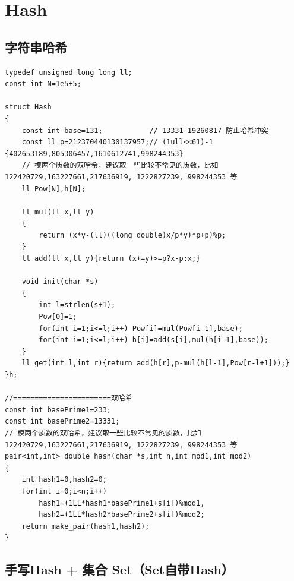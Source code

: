 \section{Hash}
\subsection{字符串哈希}
\begin{verbatim}
typedef unsigned long long ll;
const int N=1e5+5;

struct Hash
{
    const int base=131;           // 13331 19260817 防止哈希冲突
    const ll p=212370440130137957;// (1ull<<61)-1 {402653189,805306457,1610612741,998244353}
    // 模两个质数的双哈希，建议取一些比较不常见的质数，比如 122420729,163227661,217636919, 1222827239, 998244353 等
    ll Pow[N],h[N];
 
    ll mul(ll x,ll y)
    {
        return (x*y-(ll)((long double)x/p*y)*p+p)%p;
    }
    ll add(ll x,ll y){return (x+=y)>=p?x-p:x;} 
 
    void init(char *s)
    {
        int l=strlen(s+1); 
        Pow[0]=1; 
        for(int i=1;i<=l;i++) Pow[i]=mul(Pow[i-1],base);
        for(int i=1;i<=l;i++) h[i]=add(s[i],mul(h[i-1],base));
    }
    ll get(int l,int r){return add(h[r],p-mul(h[l-1],Pow[r-l+1]));}
}h;

//=======================双哈希
const int basePrime1=233;
const int basePrime2=13331;
// 模两个质数的双哈希，建议取一些比较不常见的质数，比如 122420729,163227661,217636919, 1222827239, 998244353 等
pair<int,int> double_hash(char *s,int n,int mod1,int mod2)
{
    int hash1=0,hash2=0;
    for(int i=0;i<n;i++)
        hash1=(1LL*hash1*basePrime1+s[i])%mod1,
        hash2=(1LL*hash2*basePrime2+s[i])%mod2;
    return make_pair(hash1,hash2);
}
\end{verbatim}

\subsection{手写Hash + 集合 Set（Set自带Hash）}

